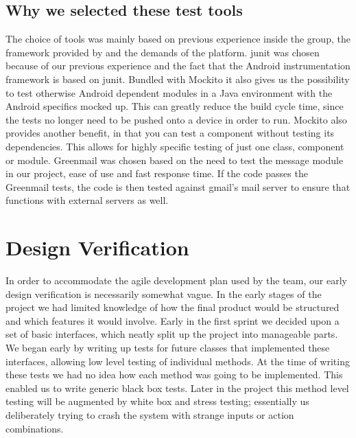 \newpage

\subsection{Why we selected these test tools}
The choice of tools was mainly based on previous experience inside the group, the framework provided by and the demands of the platform. 
\newline
\newline
\gls{junit} was chosen because of our previous experience and the fact that the Android instrumentation framework is based on \gls{junit}. Bundled with Mockito it also gives us the possibility to test otherwise Android dependent modules in a Java environment with the Android specifics mocked up. This can greatly reduce the build cycle time, since the tests no longer need to be pushed onto a device in order to run. Mockito also provides another benefit, in that you can test a component without testing its dependencies. This allows for highly specific testing of just one class, component or module.
\newline
\newline
Greenmail was chosen based on the need to test the message module in our project, ease of use and fast response time. If the code passes the Greenmail tests, the code is then tested against gmail’s mail server to ensure that functions with external servers as well. 


\section{Design Verification}
In order to accommodate the agile development plan used by the team, our early design verification is necessarily somewhat vague. In the early stages of the project we had limited knowledge of how the final product would be structured and which features it would involve.
\newline
\newline
Early in the first sprint we decided upon a set of basic interfaces, which neatly split up the project into manageable parts. We began early by writing up tests for future classes that implemented these interfaces, allowing low level testing of individual methods. At the time of writing these tests we had no idea how each method was going to be implemented. This enabled us to write generic black box tests.
\newline
\newline
Later in the project this method level testing will be augmented by white box and stress testing; essentially us deliberately trying to crash the system with strange inputs or action combinations. 
